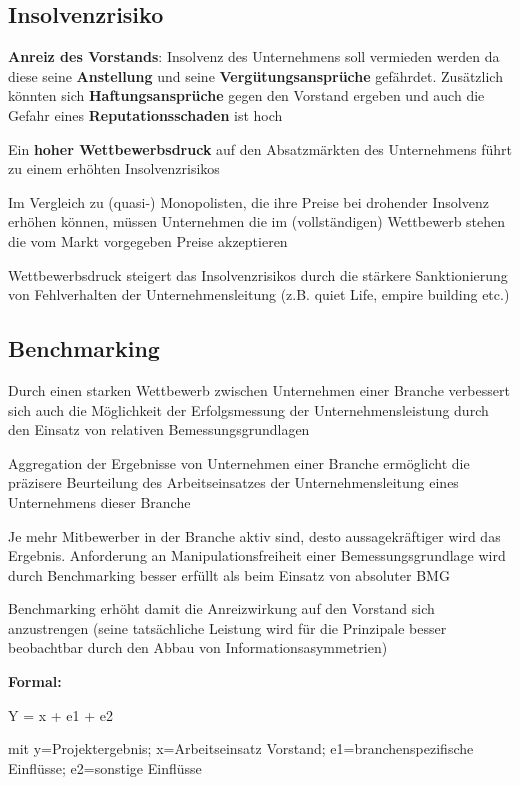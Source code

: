\documentclass[
]{article}
\begin{document}
\hypertarget{insolvenzrisiko}{%
\subsection{Insolvenzrisiko}\label{insolvenzrisiko}}

\textbf{Anreiz des Vorstands}: Insolvenz des Unternehmens soll vermieden
werden da diese seine \textbf{Anstellung} und seine
\textbf{Vergütungsansprüche} gefährdet. Zusätzlich könnten sich
\textbf{Haftungsansprüche} gegen den Vorstand ergeben und auch die
Gefahr eines \textbf{Reputationsschaden} ist hoch

Ein \textbf{hoher Wettbewerbsdruck} auf den Absatzmärkten des
Unternehmens führt zu einem erhöhten Insolvenzrisikos

Im Vergleich zu (quasi-) Monopolisten, die ihre Preise bei drohender
Insolvenz erhöhen können, müssen Unternehmen die im (vollständigen)
Wettbewerb stehen die vom Markt vorgegeben Preise akzeptieren

Wettbewerbsdruck steigert das Insolvenzrisikos durch die stärkere
Sanktionierung von Fehlverhalten der Unternehmensleitung (z.B. quiet
Life, empire building etc.)

\hypertarget{benchmarking}{%
\subsection{Benchmarking}\label{benchmarking}}

Durch einen starken Wettbewerb zwischen Unternehmen einer Branche
verbessert sich auch die Möglichkeit der Erfolgsmessung der
Unternehmensleistung durch den Einsatz von relativen
Bemessungsgrundlagen

Aggregation der Ergebnisse von Unternehmen einer Branche ermöglicht die
präzisere Beurteilung des Arbeitseinsatzes der Unternehmensleitung eines
Unternehmens dieser Branche

Je mehr Mitbewerber in der Branche aktiv sind, desto aussagekräftiger
wird das Ergebnis. Anforderung an Manipulationsfreiheit einer
Bemessungsgrundlage wird durch Benchmarking besser erfüllt als beim
Einsatz von absoluter BMG

Benchmarking erhöht damit die Anreizwirkung auf den Vorstand sich
anzustrengen (seine tatsächliche Leistung wird für die Prinzipale besser
beobachtbar durch den Abbau von Informationsasymmetrien)

\textbf{Formal:}

Y = x + e1 + e2

mit y=Projektergebnis; x=Arbeitseinsatz Vorstand; e1=branchenspezifische
Einflüsse; e2=sonstige Einflüsse
\end{document}
